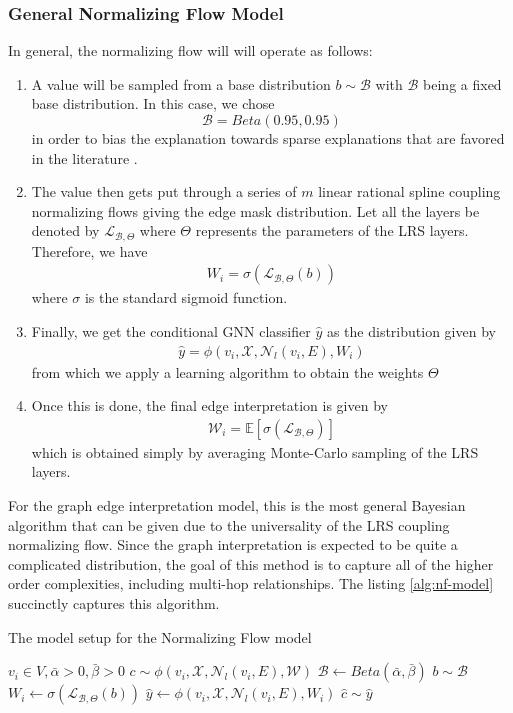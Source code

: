 \subsubsection{General Normalizing Flow Model}
In general, the normalizing flow will will operate as follows:
\begin{enumerate}
	\item A value will be sampled from a base distribution $b \sim \mathcal{B}$ with $\mathcal{B}$ being a fixed base distribution. In this case, we chose 
	\[
		\mathcal{B} = Beta(0.95, 0.95)
	\]
	in order to bias the explanation towards sparse explanations that are favored in the literature \cite{yuan_explainability_2021}.
	\item The value then gets put through a series of $m$ linear rational spline coupling normalizing flows giving the edge mask distribution. Let all the layers be denoted by $\mathcal{L}_{\mathcal{B}, \Theta}$ where $\Theta$ represents the parameters of the LRS layers. Therefore, we have
	\begin{align*}
		W_i = \sigma(\mathcal{L}_{\mathcal{B}, \Theta}(b))
	\end{align*}
	where $\sigma$ is the standard sigmoid function.
	\item Finally, we get the conditional GNN classifier $\hat{y}$ as the distribution given by
	\begin{align*}
		\hat{y} = \phi(v_i, \mathcal{X}, \mathcal{N}_l(v_i, E), W_i)
	\end{align*}
	from which we apply a learning algorithm to obtain the weights $\Theta$
	\item Once this is done, the final edge interpretation is given by
	\begin{align*}
		\mathcal{W}_i = \mathbb{E}[\sigma(\mathcal{L}_{\mathcal{B}, \Theta})]
	\end{align*}
	which is obtained simply by averaging Monte-Carlo sampling of the LRS layers.
\end{enumerate}
For the graph edge interpretation model, this is the most general Bayesian algorithm that can be given due to the universality of the LRS coupling normalizing flow. Since the graph interpretation is expected to be quite a complicated distribution, the goal of this method is to capture all of the higher order complexities, including multi-hop relationships. The listing \ref{alg:nf-model} succinctly captures this algorithm.
\begin{algorithm}[h]
	\centering
	\caption{The model setup for the Normalizing Flow model}
	\label{alg:nf-model}
	\begin{algorithmic}
		\Require $v_i \in V, \bar{\alpha} > 0, \bar{\beta} > 0$
		\Require $c \sim \phi(v_i, \mathcal{X}, \mathcal{N}_l(v_i, E), \mathcal{W})$
		\State $\mathcal{B} \gets Beta(\bar{\alpha}, \bar{\beta})$
		\State $b \sim \mathcal{B}$
		\State $W_i \gets \sigma(\mathcal{L}_{\mathcal{B}, \Theta}(b))$
		\State $\hat{y} \gets \phi(v_i, \mathcal{X}, \mathcal{N}_l(v_i, E), W_i)$
		\State $\hat{c} \sim \hat{y}$
	\end{algorithmic}
\end{algorithm}

